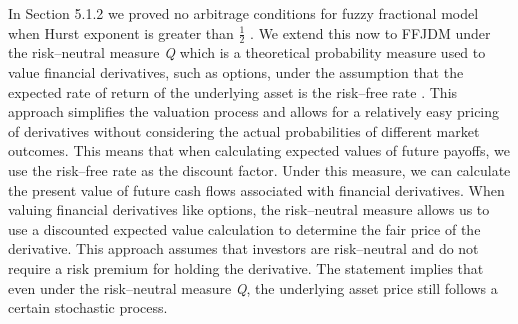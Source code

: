 \documentclass[12pt,a4paper]{report}
\numberwithin{equation}{section}
\begin{document}
In Section 5.1.2 we proved no arbitrage conditions for fuzzy fractional
model when Hurst exponent is greater than $\frac{1}{2}$ \cite{thao2006approximate_80} \cite{jafari2021fuzzy_81}. We extend
this now to FFJDM under the risk--neutral measure \emph{Q} which is a
theoretical probability measure used to value financial derivatives,
such as options, under the assumption that the expected rate of return
of the underlying asset is the risk--free rate \cite{bjrk2009arbitrage_89}. This approach
simplifies the valuation process and allows for a relatively easy
pricing of derivatives without considering the actual probabilities of
different market outcomes. This means that when calculating expected
values of future payoffs, we use the risk--free rate as the discount
factor. Under this measure, we can calculate the present value of future
cash flows associated with financial derivatives. When valuing financial
derivatives like options, the risk--neutral measure allows us to use a
discounted expected value calculation to determine the fair price of the
derivative. This approach assumes that investors are risk--neutral and do
not require a risk premium for holding the derivative. The statement
implies that even under the risk--neutral measure \emph{Q}, the
underlying asset price still follows a certain stochastic process.
\end{document}
